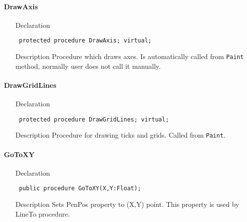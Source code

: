 \documentclass[12pt,a4paper,oneside]{report}
\newcommand{\declarationitem}[1]{{\addfontfeatures{FakeSlant} #1}}
\newcommand{\descriptiontitle}[1]{{\addfontfeatures{FakeSlant}#1}}
\newcommand{\code}[1]{\texttt{#1}}
\begin{document}
\paragraph{DrawAxis}\hspace*{\fill}
\label{lmcoordsys.TCoordSys-DrawAxis}
\begin{itemize}\item[\declarationitem{Declaration}\hfill]
	\begin{flushleft}
		\code{
			protected procedure DrawAxis; virtual;}
	\end{flushleft}
	\item[\descriptiontitle{Description}] Procedure which draws axes. Is automatically called from \code{Paint} method, normally user does not call it manually.
\end{itemize}
\paragraph{DrawGridLines}\hspace*{\fill}
\label{lmcoordsys.TCoordSys-DrawGridLines}
\begin{itemize}\item[\declarationitem{Declaration}\hfill]
	\begin{flushleft}
		\code{
			protected procedure DrawGridLines; virtual;}
	\end{flushleft}
	\item[\descriptiontitle{Description}] Procedure for drawing ticks and grids. Called from \code{Paint}.
\end{itemize}




\paragraph{GoToXY}\hspace*{\fill}\label{lmcoordsys.TCoordSys-GoToXY}
\begin{itemize}\item[\declarationitem{Declaration}\hfill]
	\begin{flushleft}
		\code{
			public procedure GoToXY(X,Y:Float);}
	\end{flushleft}
	\item[\descriptiontitle{Description}]
	Sets PenPos property to (X,Y) point. This property is used by LineTo procedure.
	
\end{itemize}
\end{document}
